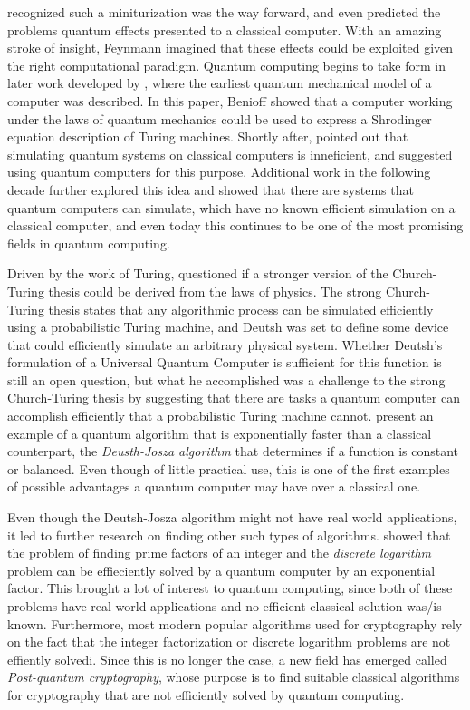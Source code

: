 \documentclass[../../dissertation.tex]{subfiles}
\begin{document}
\cite{feynman1959} recognized such a miniturization was the way forward, and
even predicted the problems quantum effects presented to a classical computer.
With an amazing stroke of insight, Feynmann imagined that these effects could
be exploited given the right computational paradigm. Quantum computing begins
to take form in later work developed by \cite{benioff1980}, where the earliest
quantum mechanical model of a computer was described. In this paper, Benioff
showed that a computer working under the laws of quantum mechanics could be
used to express a Shrodinger equation description of Turing machines. Shortly
after, \cite{feynman1982} pointed out that simulating quantum systems on
classical computers is inneficient, and suggested using quantum computers for
this purpose. Additional work in the following decade further explored this
idea and showed that there are systems that quantum computers can simulate,
which have no known efficient simulation on a classical computer, and even
today this continues to be one of the most promising fields in quantum
computing.\par Driven by the work of Turing, \cite{deutsch1985} questioned if a
stronger version of the Church-Turing thesis could be derived from the laws of
physics. The strong Church-Turing thesis states that any algorithmic process
can be simulated efficiently using a probabilistic Turing machine, and Deutsh
was set to define some device that could efficiently simulate an arbitrary
physical system. Whether Deutsh's formulation of a Universal Quantum Computer
is sufficient for this function is still an open question, but what he
accomplished was a challenge to the strong Church-Turing thesis by suggesting
that there are tasks a quantum computer can accomplish efficiently that a
probabilistic Turing machine cannot. \cite{deutsch1992} present an example of a
quantum algorithm that is exponentially faster than a classical counterpart,
the \textit{Deusth-Josza algorithm } that determines if a function is constant
or balanced. Even though of little practical use, this is one of the first
examples of possible advantages a quantum computer may have over a classical
one.\par

Even though the Deutsh-Josza algorithm might not have real world applications,
it led to further research on finding other such types of algorithms.
\cite{shor1994} showed that the problem of finding prime factors of an integer
and the \textit{discrete logarithm} problem can be effieciently solved by a
quantum computer by an exponential factor. This brought a lot of interest to
quantum computing, since both of these problems have real world applications
and no efficient classical solution was/is known. Furthermore, most modern
popular algorithms used for cryptography rely on the fact that the integer
factorization or discrete logarithm problems are not effiently solvedi. Since
this is no longer the case, a new field has emerged called \textit{Post-quantum
cryptography}, whose purpose is to find suitable classical algorithms for
cryptography that are not efficiently solved by quantum computing.\par
\end{document}
